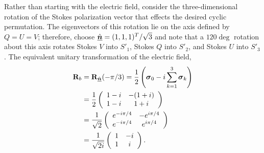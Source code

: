 Rather than starting with the electric field, consider the three-dimensional rotation of the Stokes polarization vector that effects the desired cyclic permutation.
%
The eigenvectors of this rotation lie on the axis defined by $Q=U=V$; therefore,
choose $\hat{\Pv{n}}=(1,1,1)^T/\sqrt{3}$ and note that a $120\deg$ rotation about this axis rotates Stokes $V$ into $S'_1$, Stokes $Q$ into $S'_2$, and Stokes $U$ into $S'_3$.
%
The equivalent unitary transformation of the electric field,
%
\begin{equation}
\begin{split}
\JM{R}_b 
  &= \vRotation[n](-\pi/3) = \frac{1}{2} \left( \pauli{0} - \Ci \sum_{k=1}^3 \pauli{k} \right) \\
  &= \frac{1}{2}
  \left( \begin{array}{cc}
    1-\Ci & -(1+\Ci) \\
    1-\Ci & 1+\Ci
  \end{array} \right)\\
  &= \frac{1}{\sqrt{2}}
  \left( \begin{array}{cc}
    e^{-i\pi/4} & -e^{i\pi/4} \\
    e^{-i\pi/4} & e^{i\pi/4}
  \end{array} \right)\\
  &= \frac{1}{\sqrt{2i}}
  \left( \begin{array}{cc}
    1 & -i \\
    1 & i
  \end{array} \right).
\end{split}
\end{equation}
%
